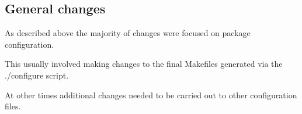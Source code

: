 \subsection{General changes}\label{Minor changes}

As described above the majority of changes were focused on package configuration.

This usually involved making changes to the final Makefiles generated via the ./configure script.

At other times additional changes needed to be carried out to other configuration files.
